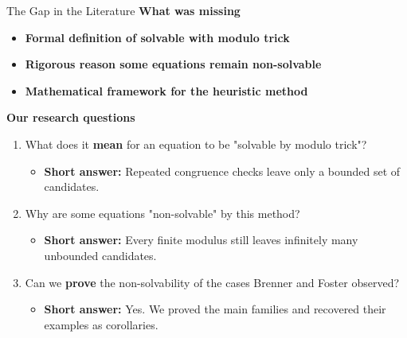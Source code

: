 \begin{frame}{The Gap in the Literature}
    \textbf{What was missing}
    \begin{itemize}
        \item \textbf{Formal definition of solvable with modulo trick}
        \item \textbf{Rigorous reason some equations remain non-solvable}
        \item \textbf{Mathematical framework for the heuristic method}
    \end{itemize}

    \vspace{0.15cm}
    \textbf{Our research questions}
    \begin{enumerate}
        \item What does it \textbf{mean} for an equation to be "solvable by modulo trick"?
        \begin{itemize}
            \item \textbf{Short answer:} Repeated congruence checks leave only a bounded set of candidates.
        \end{itemize}
        \item Why are some equations "non-solvable" by this method?
        \begin{itemize}
            \item \textbf{Short answer:} Every finite modulus still leaves infinitely many unbounded candidates.
        \end{itemize}
        \item Can we \textbf{prove} the non-solvability of the cases Brenner and Foster observed?
        \begin{itemize}
            \item \textbf{Short answer:} Yes. We proved the main families and recovered their examples as corollaries.
        \end{itemize}
    \end{enumerate}
\end{frame}

